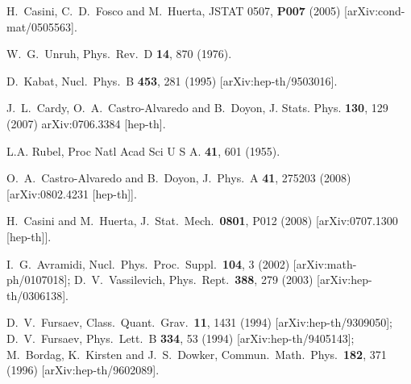\documentclass[11pt]{article}
\begin{document}
\begin{thebibliography}{99}
  H.~Casini, C.~D.~Fosco and M.~Huerta, 
  JSTAT 0507, {\bf P007} (2005) [arXiv:cond-mat/0505563].


  W.~G.~Unruh,
  Phys.\ Rev.\  D {\bf 14}, 870 (1976).



   D.~Kabat,
  Nucl.\ Phys.\ B {\bf 453}, 281 (1995)
  [arXiv:hep-th/9503016].

  
  J.~L.~Cardy, O.~A.~Castro-Alvaredo and B.~Doyon,
   J. Stats. Phys. {\bf 130},  129 (2007)  
  arXiv:0706.3384 [hep-th].


L.A. Rubel,
 Proc Natl Acad Sci U S A. {\bf 41}, 601 (1955). 


  O.~A.~Castro-Alvaredo and B.~Doyon,
  J.\ Phys.\ A  {\bf 41}, 275203 (2008)
  [arXiv:0802.4231 [hep-th]].



  H.~Casini and M.~Huerta,
  J.\ Stat.\ Mech.\  {\bf 0801}, P012 (2008)
  [arXiv:0707.1300 [hep-th]].








  I.~G.~Avramidi,
  Nucl.\ Phys.\ Proc.\ Suppl.\  {\bf 104}, 3 (2002)
  [arXiv:math-ph/0107018];
  D.~V.~Vassilevich,
  Phys.\ Rept.\  {\bf 388}, 279 (2003)
  [arXiv:hep-th/0306138].



  D.~V.~Fursaev,
  Class.\ Quant.\ Grav.\  {\bf 11}, 1431 (1994)
  [arXiv:hep-th/9309050];
  D.~V.~Fursaev,
  Phys.\ Lett.\  B {\bf 334}, 53 (1994)
  [arXiv:hep-th/9405143];
  M.~Bordag, K.~Kirsten and J.~S.~Dowker,
  Commun.\ Math.\ Phys.\  {\bf 182}, 371 (1996)
  [arXiv:hep-th/9602089].
  

\end{thebibliography}
\end{document}
